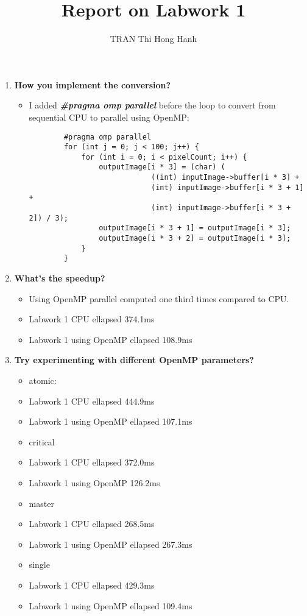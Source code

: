\documentclass{article}
\title{Report on Labwork 1}
\author{TRAN Thi Hong Hanh}
\begin{document}
\maketitle
\begin{enumerate}
    \item \textbf{How you implement the conversion?}
    \begin{itemize}
        \item I added \textbf{\textit{\#pragma omp parallel}} before the loop to convert from sequential CPU to parallel using OpenMP:
    \begin{verbatim}
        #pragma omp parallel 
        for (int j = 0; j < 100; j++) {     
            for (int i = 0; i < pixelCount; i++) {
                outputImage[i * 3] = (char) (
                            ((int) inputImage->buffer[i * 3] +
                            (int) inputImage->buffer[i * 3 + 1] +
                            (int) inputImage->buffer[i * 3 + 2]) / 3);
                outputImage[i * 3 + 1] = outputImage[i * 3];
                outputImage[i * 3 + 2] = outputImage[i * 3];
            }
        }
    \end{verbatim}
    \end{itemize}
    \item \textbf{What’s the speedup?}
    \begin{itemize}
        \item Using OpenMP parallel computed one third times compared to CPU.
        \item [] Labwork 1 CPU ellapsed 374.1ms
        \item [] Labwork 1 using OpenMP ellapsed 108.9ms
    \end{itemize}
    \item \textbf{Try experimenting with different OpenMP parameters?}
    \begin{itemize}
        \item atomic:
        \item [] Labwork 1 CPU ellapsed 444.9ms
        \item [] Labwork 1 using OpenMP  ellapsed 107.1ms
        \item critical
        \item [] Labwork 1 CPU ellapsed 372.0ms
        \item [] Labwork 1 using OpenMP 126.2ms
        \item master
        \item [] Labwork 1 CPU ellapsed 268.5ms
        \item [] Labwork 1 using OpenMP ellapsed 267.3ms
        \item single
        \item []  Labwork 1 CPU ellapsed 429.3ms
        \item [] Labwork 1 using OpenMP ellapsed 109.4ms



    \end{itemize}
\end{enumerate}
\end{document}
